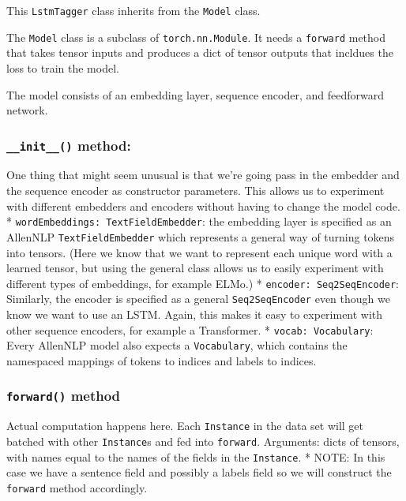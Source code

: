 \documentclass[
]{article}
\begin{document}
This \texttt{LstmTagger} class inherits from the \texttt{Model} class.

The \texttt{Model} class is a subclass of \texttt{torch.nn.Module}. It
needs a \texttt{forward} method that takes tensor inputs and produces a
dict of tensor outputs that incldues the loss to train the model.

The model consists of an embedding layer, sequence encoder, and
feedforward network.

\hypertarget{init__-method-1}{%
\subsubsection{\texorpdfstring{\texttt{\_\_init\_\_()}
method:}{\_\_init\_\_() method:}}\label{init__-method-1}}

One thing that might seem unusual is that we're going pass in the
embedder and the sequence encoder as constructor parameters. This allows
us to experiment with different embedders and encoders without having to
change the model code. * \texttt{wordEmbeddings:\ TextFieldEmbedder}:
the embedding layer is specified as an AllenNLP
\texttt{TextFieldEmbedder} which represents a general way of turning
tokens into tensors. (Here we know that we want to represent each unique
word with a learned tensor, but using the general class allows us to
easily experiment with different types of embeddings, for example ELMo.)
* \texttt{encoder:\ Seq2SeqEncoder}: Similarly, the encoder is specified
as a general \texttt{Seq2SeqEncoder} even though we know we want to use
an LSTM. Again, this makes it easy to experiment with other sequence
encoders, for example a Transformer. * \texttt{vocab:\ Vocabulary}:
Every AllenNLP model also expects a \texttt{Vocabulary}, which contains
the namespaced mappings of tokens to indices and labels to indices.

\hypertarget{forward-method}{%
\subsubsection{\texorpdfstring{\texttt{forward()}
method}{forward() method}}\label{forward-method}}

Actual computation happens here. Each \texttt{Instance} in the data set
will get batched with other \texttt{Instance}s and fed into
\texttt{forward}. Arguments: dicts of tensors, with names equal to the
names of the fields in the \texttt{Instance}. * NOTE: In this case we
have a sentence field and possibly a labels field so we will construct
the \texttt{forward} method accordingly.
\end{document}
